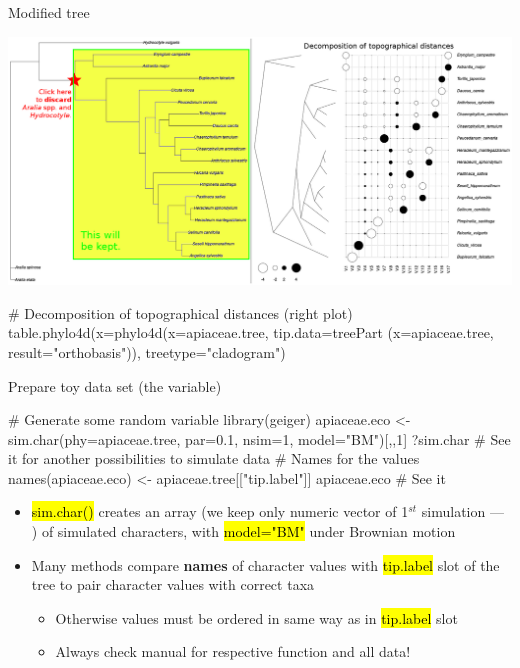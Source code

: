\documentclass[compress, ucs, xelatex, 11pt, xcolor=svgnames,
  hyperref={
    bookmarks=true,
    unicode=true,
    colorlinks=true,
    pdftitle={Molecular data in R},
    plainpages=false,
    pdfauthor={Vojtech Zeisek},
    pdfsubject={Course about phylogeny and evolution in R},
    pdfcreator={XeLaTeX},
    pdfkeywords={R, evolution, phylogeny, molecular data},
    linkcolor=Tomato,
    anchorcolor=SaddleBrown,
    citecolor=Goldenrod,
    filecolor=DarkMagenta,
    menucolor=Sienna,
    urlcolor=DarkTurquoise,
    pdftex},
  url={hyphens, lowtilde} %
  ]{beamer}
\renewcommand{\texttt}[1]{\hl{\ttfamily #1}}
\begin{document}
\begin{frame}[fragile]{Modified tree}
  \begin{center}
    \includegraphics[width=\textwidth-2cm]{apiaceae_tree.png}
  \end{center}
  \begin{spluscode}
    # Decomposition of topographical distances (right plot)
    table.phylo4d(x=phylo4d(x=apiaceae.tree, tip.data=treePart
      (x=apiaceae.tree, result="orthobasis")), treetype="cladogram")
  \end{spluscode}
\end{frame}

\begin{frame}[fragile]{Prepare toy data set (the variable)}
  \begin{spluscode}
    # Generate some random variable
    library(geiger)
    apiaceae.eco <- sim.char(phy=apiaceae.tree, par=0.1, nsim=1,
      model="BM")[,,1]
    ?sim.char # See it for another possibilities to simulate data
    # Names for the values
    names(apiaceae.eco) <- apiaceae.tree[["tip.label"]]
    apiaceae.eco # See it
  \end{spluscode}
  \begin{itemize}
    \item \texttt{sim.char()} creates an array (we keep only numeric vector of 1$^{st}$ simulation --- \texttt{[,,1]}) of simulated characters, with \texttt{model="BM"} under Brownian motion
    \item Many methods compare \textbf{names} of character values with \texttt{tip.label} slot of the tree to pair character values with correct taxa
    \begin{itemize}
      \item Otherwise values must be ordered in same way as in \texttt{tip.label} slot
      \item \alert{Always check manual for respective function and all data!}
    \end{itemize}
  \end{itemize}
\end{frame}
\end{document}
